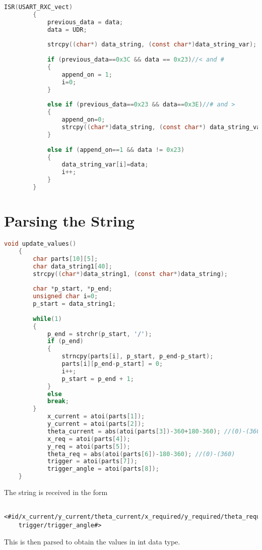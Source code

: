 \documentclass[main.tex]{subfiles}
\begin{document}
	\begin{lstlisting}[language=C, caption = Interrupt Service Routine]
		ISR(USART_RXC_vect)
		{		
			previous_data = data;
			data = UDR;
			
			strcpy((char*) data_string, (const char*)data_string_var); //Entire string received!! Save it!!
		
			if (previous_data==0x3C && data == 0x23)//< and #
			{
				append_on = 1;
				i=0;
			}
			
			else if (previous_data==0x23 && data==0x3E)//# and >
			{
				append_on=0;
				strcpy((char*)data_string, (const char*) data_string_var); //Entire string received!! Save it!!
			}
			
			else if (append_on==1 && data != 0x23)
			{
				data_string_var[i]=data;
				i++;
			}
		}
	\end{lstlisting}
	
	\section{Parsing the String}
	
	\begin{lstlisting}[language=C, caption = String Parsing Function]
	void update_values()
	{
		char parts[10][5];
		char data_string1[40];
		strcpy((char*)data_string1, (const char*)data_string);
		
		char *p_start, *p_end;
		unsigned char i=0;
		p_start = data_string1;
		
		while(1) 
		{
			p_end = strchr(p_start, '/');
			if (p_end)
			{
				strncpy(parts[i], p_start, p_end-p_start);
				parts[i][p_end-p_start] = 0;
				i++;
				p_start = p_end + 1;
			}
			else
			break;
		}
			x_current = atoi(parts[1]);
			y_current = atoi(parts[2]);
			theta_current = abs(atoi(parts[3])-360+180-360); //(0)-(360)
			x_req = atoi(parts[4]);
			y_req = atoi(parts[5]);
			theta_req = abs(atoi(parts[6])-180-360); //(0)-(360)
			trigger = atoi(parts[7]);
			trigger_angle = atoi(parts[8]);
	}
	\end{lstlisting}
	
	\noindent The string is received in the form
	\begin{verbatim}
	<#id/x_current/y_current/theta_current/x_required/y_required/theta_required/
	trigger/trigger_angle#>
	\end{verbatim}
	This is then parsed to obtain the values in int data type.
	
	\pagebreak	
\end{document}
